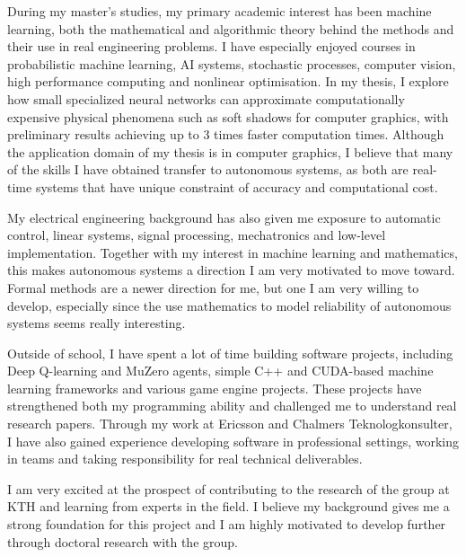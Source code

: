 \documentclass[a4paper,11pt]{letter}
\begin{document}
During my master's studies, my primary academic interest has been machine learning, both the mathematical and algorithmic theory behind the methods and their use in real engineering problems. I have especially enjoyed courses in probabilistic machine learning, AI systems, stochastic processes, computer vision, high performance computing and nonlinear optimisation. In my thesis, I explore how small specialized neural networks can approximate computationally expensive physical phenomena such as soft shadows for computer graphics, with preliminary results achieving up to 3 times faster computation times.
Although the application domain of my thesis is in computer graphics, I believe that many of the skills I have obtained transfer to autonomous systems, as both are real-time systems that have unique constraint of accuracy and computational cost.

My electrical engineering background has also given me exposure to automatic control, linear systems, signal processing, mechatronics and low-level implementation. Together with my interest in machine learning and mathematics, this makes autonomous systems a direction I am very motivated to move toward. Formal methods are a newer direction for me,
but one I am very willing to develop, especially since the use mathematics to model reliability of autonomous systems seems really interesting.

Outside of school, I have spent a lot of time building software projects, including Deep Q-learning and MuZero agents, simple C++ and CUDA-based machine learning frameworks and various game engine projects. These projects have strengthened both my programming ability and challenged me to understand real research papers. Through my work at Ericsson and Chalmers Teknologkonsulter, I have also gained experience developing software in professional settings, working in teams and taking responsibility for real technical deliverables.

I am very excited at the prospect of contributing to the research of the group at KTH and learning from experts in the field.
I believe my background gives me a strong foundation for this project and I am highly motivated to develop further through doctoral research with the group.
\end{document}
